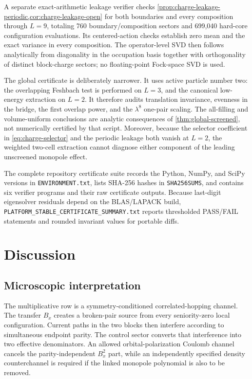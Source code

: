 \documentclass[11pt]{article}
\theoremstyle{definition}
\theoremstyle{remark}
\begin{document}
A separate exact-arithmetic leakage verifier checks \cref{prop:charge-leakage-periodic,cor:charge-leakage-open} for both boundaries and every composition through $L=9$, totaling 760 boundary/composition sectors and 699,040 hard-core configuration evaluations.  Its centered-action checks establish zero mean and the exact variance in every composition.  The operator-level SVD then follows analytically from diagonality in the occupation basis together with orthogonality of distinct block-charge sectors; no floating-point Fock-space SVD is used.

The global certificate is deliberately narrower.  It uses active particle number two: the overlapping Feshbach test is performed on $L=3$, and the canonical low-energy extraction on $L=2$.  It therefore audits translation invariance, evenness in the bridge, the first overlap power, and the $\lambda^8$ one-pair scaling.  The all-filling and volume-uniform conclusions are analytic consequences of \cref{thm:global-screened}, not numerically certified by that script.  Moreover, because the selector coefficient in \eqref{eq:charge-selector} and the periodic leakage both vanish at $L=2$, the weighted two-cell extraction cannot diagnose either component of the leading unscreened monopole effect.

The complete repository certificate suite records the Python, NumPy, and SciPy versions in \texttt{ENVIRONMENT.txt}, lists SHA-256 hashes in \texttt{SHA256SUMS}, and contains six verifier programs and their raw certificate outputs.  Because last-digit eigensolver residuals depend on the BLAS/LAPACK build, \texttt{PLATFORM\_STABLE\_CERTIFICATE\_SUMMARY.txt} reports thresholded PASS/FAIL statements and rounded invariant values for portable diffs.
\section{Discussion}
\label{sec:discussion}

\subsection{Microscopic interpretation}

The multiplicative row is a symmetry-conditioned correlated-hopping channel.  The transfer $B_x$ creates a broken-pair source from every seniority-zero local configuration.  Current paths in the two blocks then interfere according to simultaneous endpoint parity.  The control sector converts that interference into two effective denominators.  An allowed orbital-polarization Coulomb channel cancels the parity-independent $B_x^2$ part, while an independently specified density counterchannel is required if the linked monopole polynomial is also to be removed.
\end{document}
